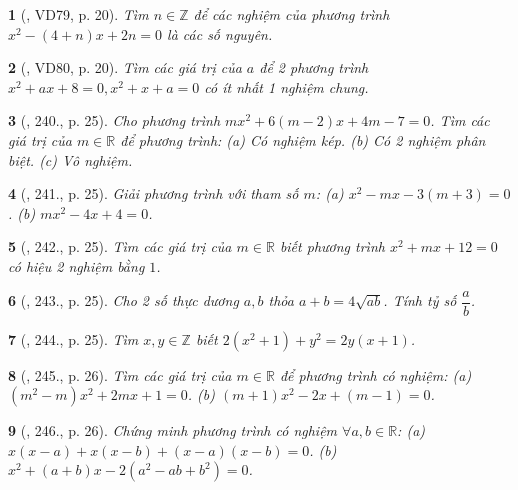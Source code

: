 \documentclass{article}
\newtheorem{baitoan}{}
\begin{document}
\begin{baitoan}[\cite{Binh_Toan_9_tap_2}, VD79, p. 20]
	Tìm $n\in\mathbb{Z}$ để các nghiệm của phương trình $x^2 - (4 + n)x + 2n = 0$ là các số nguyên.
\end{baitoan}

\begin{baitoan}[\cite{Binh_Toan_9_tap_2}, VD80, p. 20]
	Tìm các giá trị của $a$ để 2 phương trình $x^2 + ax + 8 = 0,x^2 + x + a = 0$ có ít nhất 1 nghiệm chung.
\end{baitoan}

\begin{baitoan}[\cite{Binh_Toan_9_tap_2}, 240., p. 25]
	Cho phương trình $mx^2 + 6(m - 2)x + 4m - 7 = 0$. Tìm các giá trị của $m\in\mathbb{R}$ để phương trình: (a) Có nghiệm kép. (b) Có 2 nghiệm phân biệt. (c) Vô nghiệm.
\end{baitoan}

\begin{baitoan}[\cite{Binh_Toan_9_tap_2}, 241., p. 25]
	Giải phương trình với tham số $m$: (a) $x^2 - mx - 3(m + 3) = 0$. (b) $mx^2 - 4x + 4 = 0$.
\end{baitoan}

\begin{baitoan}[\cite{Binh_Toan_9_tap_2}, 242., p. 25]
	Tìm các giá trị của $m\in\mathbb{R}$ biết phương trình $x^2 + mx + 12 = 0$ có hiệu 2 nghiệm bằng $1$.
\end{baitoan}

\begin{baitoan}[\cite{Binh_Toan_9_tap_2}, 243., p. 25]
	Cho 2 số thực dương $a,b$ thỏa $a + b = 4\sqrt{ab}$. Tính tỷ số $\dfrac{a}{b}$.
\end{baitoan}

\begin{baitoan}[\cite{Binh_Toan_9_tap_2}, 244., p. 25]
	Tìm $x,y\in\mathbb{Z}$ biết $2(x^2 + 1) + y^2 = 2y(x + 1)$.
\end{baitoan}

\begin{baitoan}[\cite{Binh_Toan_9_tap_2}, 245., p. 26]
	Tìm các giá trị của $m\in\mathbb{R}$ để phương trình có nghiệm: (a) $(m^2 - m)x^2 + 2mx + 1 = 0$. (b) $(m + 1)x^2 - 2x + (m - 1) = 0$.
\end{baitoan}

\begin{baitoan}[\cite{Binh_Toan_9_tap_2}, 246., p. 26]
	Chứng minh phương trình có nghiệm $\forall a,b\in\mathbb{R}$: (a) $x(x - a) + x(x - b) + (x - a)(x - b) = 0$. (b) $x^2 + (a + b)x - 2(a^2 - ab + b^2) = 0$.
\end{baitoan}
\end{document}
